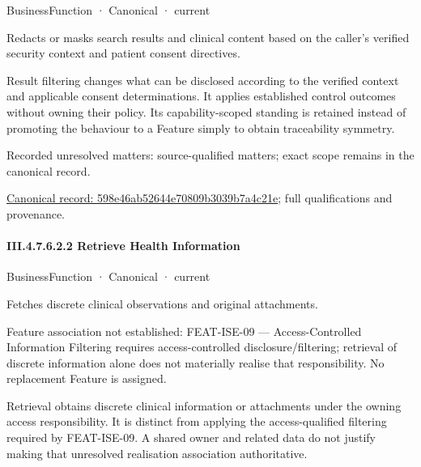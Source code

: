 \label{element:598e46ab52644e70809b3039b7a4c21e}
{\small BusinessFunction · Canonical · current}\par

Redacts or masks search results and clinical content based on the caller's verified security context and patient consent directives.



Result filtering changes what can be disclosed according to the verified context and applicable consent determinations. It applies established control outcomes without owning their policy. Its capability-scoped standing is retained instead of promoting the behaviour to a Feature simply to obtain traceability symmetry.


{\small Recorded unresolved matters: source-qualified matters; exact scope remains in the canonical record.}\par
{\footnotesize \href{../../../../continuum/business/business-function/598e46ab52644e70809b3039b7a4c21e.md}{Canonical record: 598e46ab52644e70809b3039b7a4c21e}; full qualifications and provenance.}\par
\paragraph*{III.4.7.6.2.2 Retrieve Health Information}
\label{navigation:III.4.7.6.2.2}

\label{element:0afb265973744f6f9e95ee54e6ea5b77}
{\small BusinessFunction · Canonical · current}\par

Fetches discrete clinical observations and original attachments.



Feature association not established: FEAT-ISE-09 — Access-Controlled Information Filtering requires access-controlled disclosure/filtering; retrieval of discrete information alone does not materially realise that responsibility. No replacement Feature is assigned.



Retrieval obtains discrete clinical information or attachments under the owning access responsibility. It is distinct from applying the access-qualified filtering required by FEAT-ISE-09. A shared owner and related data do not justify making that unresolved realisation association authoritative.


